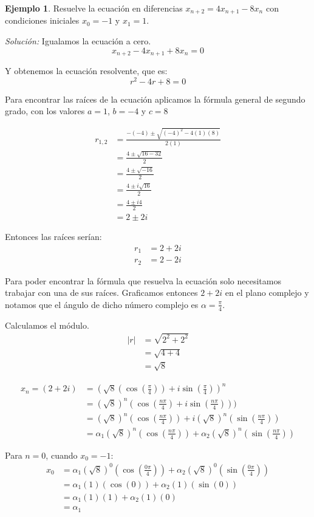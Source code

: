 \documentclass{report}
\theoremstyle{definition}
\newtheorem{ejemplo}[teorema]{Ejemplo}
\begin{document}
\begin{ejemplo}
Resuelve la ecuación en diferencias $x_{n+2}=4x_{n+1}-8x_n$ con condiciones iniciales $x_0=-1$ y $x_1=1$.

\textit{Solución:} 
Igualamos la ecuación a cero.
$$x_{n+2}-4x_{n+1}+8x_n=0$$

Y obtenemos la ecuación resolvente, que es: 
$$r^2-4r+8=0$$

Para encontrar las raíces de la ecuación aplicamos la fórmula general de segundo grado, con los valores $a=1$, $b=-4$ y $c=8$

\begin{align*}
  r_{1,2}&=\frac{-(-4)\pm\sqrt{(-4)^2-4(1)(8)}}{2(1)}\\
  &=\frac{4\pm\sqrt{16-32}}{2}\\
  &=\frac{4\pm\sqrt{-16}}{2}\\
  &=\frac{4\pm i\sqrt{16}}{2}\\
  &=\frac{4\pm i4}{2}\\
  &=2\pm 2i
\end{align*}

Entonces las raíces serían:
\begin{align*}
  r_1&=2+2i\\
  r_2&=2-2i
\end{align*}

Para poder encontrar la fórmula que resuelva la ecuación solo necesitamos trabajar con una de sus raíces. Graficamos entonces $2+2i$ en el plano complejo y notamos que el ángulo de dicho número complejo es $\alpha=\frac{\pi}{4}$.

Calculamos el módulo.
\begin{align*}
  |r|&=\sqrt{2^2+2^2}\\
     &=\sqrt{4+4}\\
     &=\sqrt{8}
\end{align*}

\begin{align*}
  x_n=(2+2i)&=(\sqrt{8}(\cos(\frac{\pi}{4}))+i \sin(\frac{\pi}{4}))^n\\
  &=(\sqrt{8})^n(\cos(\frac{n\pi}{4})+i \sin(\frac{n\pi}{4})))\\
  &=(\sqrt{8})^n(\cos(\frac{n\pi}{4}))+i (\sqrt{8})^n(\sin(\frac{n\pi}{4}))\\
  &=\alpha_1(\sqrt{8})^n(\cos(\frac{n\pi}{4}))+\alpha_2(\sqrt{8})^n(\sin(\frac{n\pi}{4}))
\end{align*}

Para $n=0$, cuando $x_0=-1$:
\begin{align*}
  x_0&=\alpha_1(\sqrt{8})^0(\cos(\frac{0\pi}{4}))+\alpha_2(\sqrt{8})^0(\sin(\frac{0\pi}{4}))\\
  &=\alpha_1(1)(\cos(0))+\alpha_2(1)(\sin(0))\\
  &=\alpha_1(1)(1)+\alpha_2(1)(0)\\
  &=\alpha_1
\end{align*}


\end{ejemplo}
\end{document}
